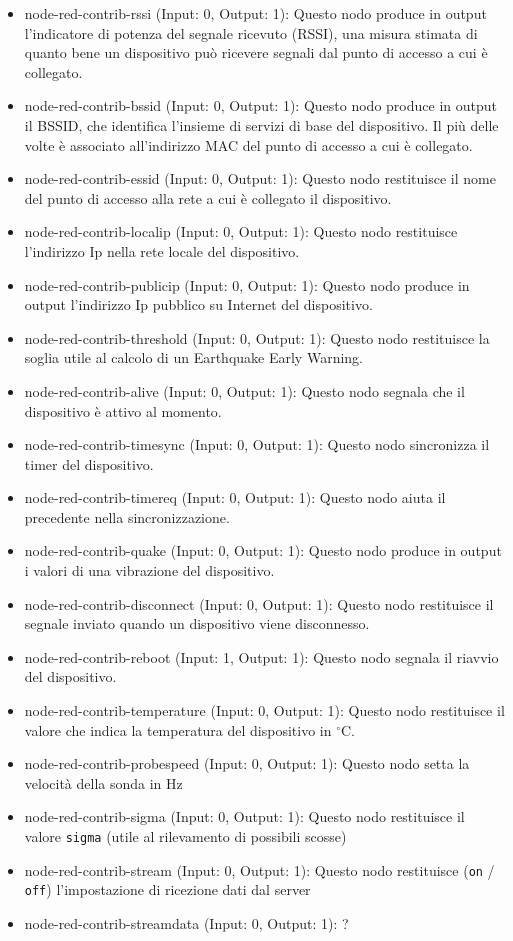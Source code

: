 \documentclass[a4paper,10pt]{memoir}
\begin{document}
\begin{itemize}
    \item node-red-contrib-rssi (Input: 0, Output: 1): Questo nodo produce in output l'indicatore di potenza del segnale ricevuto (RSSI), una misura stimata di quanto bene un dispositivo può ricevere segnali dal punto di accesso a cui è collegato.
    \item node-red-contrib-bssid (Input: 0, Output: 1): Questo nodo produce in output il BSSID, che identifica l'insieme di servizi di base del dispositivo. Il più delle volte è associato all'indirizzo MAC del punto di accesso a cui è collegato.
    \item node-red-contrib-essid (Input: 0, Output: 1): Questo nodo restituisce il nome del punto di accesso alla rete a cui è collegato il dispositivo.
    \item node-red-contrib-localip (Input: 0, Output: 1): Questo nodo restituisce l'indirizzo Ip nella rete locale del dispositivo.
    \item node-red-contrib-publicip (Input: 0, Output: 1): Questo nodo produce in output l'indirizzo Ip pubblico su Internet del dispositivo.
    \item node-red-contrib-threshold (Input: 0, Output: 1): Questo nodo restituisce la soglia utile al calcolo di un Earthquake Early Warning.
    \item node-red-contrib-alive (Input: 0, Output: 1): Questo nodo segnala che il dispositivo è attivo al momento. 
    \item node-red-contrib-timesync (Input: 0, Output: 1): Questo nodo sincronizza il timer del dispositivo.
    \item node-red-contrib-timereq (Input: 0, Output: 1): Questo nodo aiuta il precedente nella sincronizzazione.
    \item node-red-contrib-quake (Input: 0, Output: 1): Questo nodo produce in output i valori di una vibrazione del dispositivo. 
    \item node-red-contrib-disconnect (Input: 0, Output: 1): Questo nodo restituisce il segnale inviato quando un dispositivo viene disconnesso.
    \item node-red-contrib-reboot (Input: 1, Output: 1): Questo nodo segnala il riavvio del dispositivo. 
    \item node-red-contrib-temperature (Input: 0, Output: 1): Questo nodo restituisce il valore che indica la temperatura del dispositivo in $^{\circ}$C.
    \item node-red-contrib-probespeed (Input: 0, Output: 1): Questo nodo setta la velocità della sonda in Hz
    \item node-red-contrib-sigma (Input: 0, Output: 1): Questo nodo restituisce il valore \texttt{sigma} (utile al rilevamento di possibili scosse)
\item node-red-contrib-stream (Input: 0, Output: 1): Questo nodo restituisce (\texttt{on} / \texttt{off}) l'impostazione di ricezione dati dal server
    \item node-red-contrib-streamdata (Input: 0, Output: 1): ?
\end{itemize}
\end{document}
